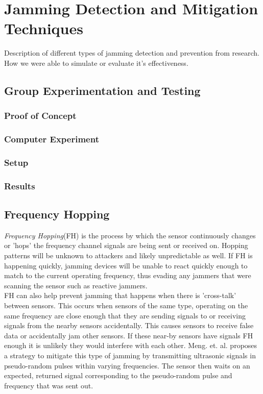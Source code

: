 \documentclass[conference]{IEEEtran}
\begin{document}
\section{Jamming Detection and Mitigation Techniques}
Description of different types of jamming detection and prevention from research. How we were able to simulate or evaluate it's effectiveness.
\subsection{Group Experimentation and Testing}
\subsubsection{Proof of Concept}
\subsubsection{Computer Experiment}
\subsubsection{Setup}
\subsubsection{Results}
\subsection{Frequency Hopping}
\textit{Frequency Hopping}(FH) is the process by which the sensor continuously changes or 'hops' the frequency channel signals are being sent or received on. Hopping patterns will be unknown to attackers and likely unpredictable as well\cite{5}. If FH is happening quickly, jamming devices will be unable to react quickly enough to match to the current operating frequency, thus evading any jammers that were scanning the sensor such as reactive jammers\cite{5}.\\
\indent FH can also help prevent jamming that happens when there is 'cross-talk' between sensors. This occurs when sensors of the same type, operating on the same frequency are close enough that they are sending signals to or receiving signals from the nearby sensors accidentally\cite{3}. This causes sensors to receive false data or accidentally jam other sensors. If these near-by sensors have signals FH enough it is unlikely they would interfere with each other. Meng. et. al. proposes a strategy to mitigate this type of jamming by transmitting ultrasonic signals in pseudo-random pulses within varying frequencies. The sensor then waits on an expected, returned signal corresponding to the pseudo-random pulse and frequency that was sent out\cite{3}.
\end{document}
